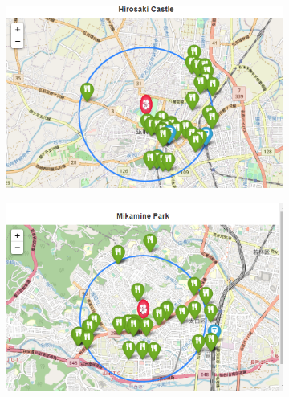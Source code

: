 \documentclass[11pt]{article}
\begin{document}
\begin{figure}[H]
  \vfill
  \centering
  \begin{subfigure}[c]{0.45\textwidth}
    \centering
    \includegraphics[width=\textwidth]{images/Hirosaki Castle_venues.png}
  \end{subfigure}
  \hfill
  \begin{subfigure}[c]{0.45\textwidth}
    \centering
    \includegraphics[width=\textwidth]{images/Mikamine Park_venues.png}
  \end{subfigure}


\end{figure}
\end{document}
